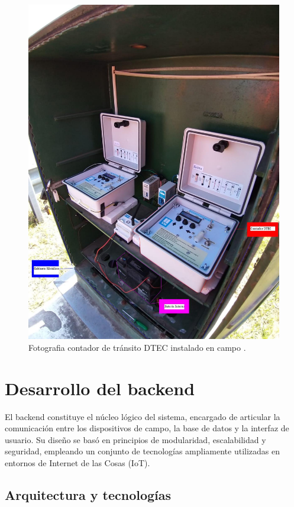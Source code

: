 \begin{figure}[htbp]
  \centering
  \includegraphics[width=0.85\linewidth]{./Figures/fotoGabinete.jpeg}
  \caption{Fotografia contador de tránsito DTEC instalado en campo \protect\footnotemark.}
  \label{fig:foto_gabinete}
\end{figure}



\section{Desarrollo del backend}

El backend constituye el núcleo lógico del sistema, encargado de articular la comunicación entre los dispositivos de campo, la base de datos y la interfaz de usuario. Su diseño se basó en principios de modularidad, escalabilidad y seguridad, empleando un conjunto de tecnologías ampliamente utilizadas en entornos de Internet de las Cosas (IoT).


\subsection{Arquitectura y tecnologías}

